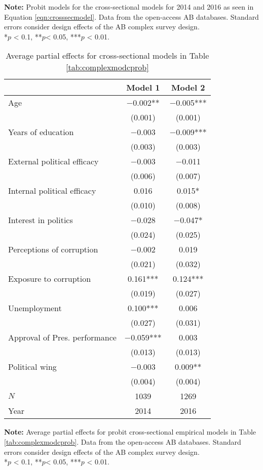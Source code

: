\documentclass[12pt,a4]{article}
\begin{document}
\begin{table}[htbp]
\begin{center}
\end{center}
\textbf{Note:} Probit models for the cross-sectional models for 2014 and 2016 as seen in Equation \ref{eqn:crosssecmodel}. Data from the open-access AB databases. Standard errors consider design effects of the AB complex survey design.\\
*$p$ < 0.1, **$p$< 0.05, ***$p$ < 0.01.
\end{table}

\begin{table}[htbp]
\begin{center}
\caption{Average partial effects for cross-sectional models in Table \ref{tab:complexmodcprob}}
\label{tab:apecrossprobit}

\begin{tabular}[t]{lcc}
\toprule
  & Model 1 & Model 2\\
\midrule
Age & \num{-0.002}** & \num{-0.005}***\\
 & (\num{0.001}) & (\num{0.001})\\
Years of education & \num{-0.003} & \num{-0.009}***\\
 & (\num{0.003}) & (\num{0.003})\\
External political efficacy & \num{-0.003} & \num{-0.011}\\
 & (\num{0.006}) & (\num{0.007})\\
Internal political efficacy & \num{0.016} & \num{0.015}*\\
 & (\num{0.010}) & (\num{0.008})\\
Interest in politics & \num{-0.028} & \num{-0.047}*\\
 & (\num{0.024}) & (\num{0.025})\\
Perceptions of corruption & \num{-0.002} & \num{0.019}\\
 & (\num{0.021}) & (\num{0.032})\\
Exposure to corruption & \num{0.161}*** & \num{0.124}***\\
 & (\num{0.019}) & (\num{0.027})\\
Unemployment & \num{0.100}*** & \num{0.006}\\
 & (\num{0.027}) & (\num{0.031})\\
Approval of Pres. performance & \num{-0.059}*** & \num{0.003}\\
 & (\num{0.013}) & (\num{0.013})\\
Political wing & \num{-0.003} & \num{0.009}**\\
 & (\num{0.004}) & (\num{0.004})\\
\midrule
$N$ & \num{1039} & \num{1269}\\
Year & 2014 & 2016\\
\bottomrule
\end{tabular}


\end{center}
\textbf{Note:} Average partial effects for probit cross-sectional empirical models in Table \ref{tab:complexmodcprob}. Data from the open-access AB databases. Standard errors consider design effects of the AB complex survey design.\\
*$p$ < 0.1, **$p$< 0.05, ***$p$ < 0.01.
\end{table}
\end{document}
